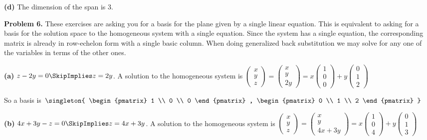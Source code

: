\documentclass[oneside,12pt]{amsart}
\begin{document}
\textbf{(d)} The dimension of the span is 3.

\bigskip


\bigskip

\textbf{Problem 6.} These exercises are asking you for a basis for the plane
given by a single linear equation. This is equivalent to asking for a basis
for the solution space to the homogeneous system with a single equation.
Since the system has a single equation, the corresponding matrix is already in row-echelon
form with a single basic column. When doing generalized back substitution we may
solve for any one of the variables in terms of the other ones.

\textbf{(a)} $z-2y=0 \SkipImplies z = 2y$. A solution to the homogeneous system
is
$
\begin{pmatrix}
x \\ y \\ z
\end{pmatrix}
=
\begin{pmatrix}
x \\ y \\ 2y
\end{pmatrix}
=
x
\begin{pmatrix}
1 \\ 0 \\ 0
\end{pmatrix}
+
y
\begin{pmatrix}
0 \\ 1 \\ 2
\end{pmatrix}
$

So a basis is
$
\singleton{
\begin{pmatrix}
1 \\ 0 \\ 0
\end{pmatrix}
,
\begin{pmatrix}
0 \\ 1 \\ 2
\end{pmatrix}
}
$

\bigskip

\textbf{(b)} $4x+3y-z=0 \SkipImplies z = 4x+3y$. A solution to the homogeneous system
is
$
\begin{pmatrix}
x \\ y \\ z
\end{pmatrix}
=
\begin{pmatrix}
x \\ y \\ 4x+3y
\end{pmatrix}
=
x
\begin{pmatrix}
1 \\ 0 \\ 4
\end{pmatrix}
+
y
\begin{pmatrix}
0 \\ 1 \\ 3
\end{pmatrix}
$
\end{document}
